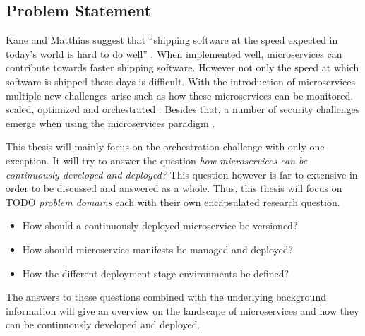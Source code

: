 
\subsection{Problem Statement}%
\label{sub:Problem_Statement}

Kane and Matthias suggest that \enquote{shipping software at the speed expected
in today's world is hard to do well} \autocite[p.
2]{SeanPKaneDocker&Running2018}. When implemented well, microservices can
contribute towards faster shipping software. However not only the speed at
which software is shipped these days is difficult. With the introduction of
microservices multiple new challenges arise such as how these microservices can
be monitored, scaled, optimized and orchestrated \autocite[p.
67]{TrihinasDevOpsasService2018}. Besides that, a number of security challenges
emerge when using the microservices paradigm
\autocite{YaryginaOvercomingSecurityChallenges2018}.

This thesis will mainly focus on the orchestration challenge with only one
exception. It will try to answer the question \textit{how microservices can be
continuously developed and deployed?} This question however is far to extensive
in order to be discussed and answered as a whole. Thus, this thesis will focus
on TODO \textit{problem domains} each with their own encapsulated research
question.

\begin{itemize}
  \item How should a continuously deployed microservice be versioned?
  \item How should microservice manifests be managed and deployed?
  \item How the different deployment stage environments be defined?
\end{itemize}

The answers to these questions combined with the underlying background
information will give an overview on the landscape of microservices and how
they can be continuously developed and deployed.
